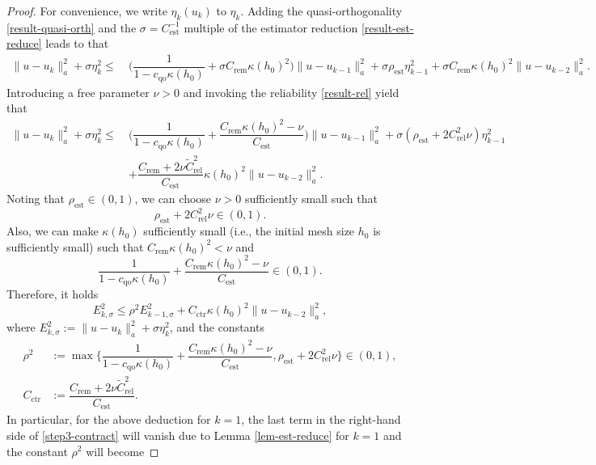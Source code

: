 \documentclass[preprint,times]{elsarticle}%
\numberwithin{algorithm}{section}
\numberwithin{equation}{section}
\newcommand{\rel}{\mathrm{rel}}
\newcommand{\est}{\mathrm{est}}
\newcommand{\rem}{\mathrm{rem}}
\newcommand{\ctr}{\mathrm{ctr}}
\newcommand{\qoo}{\mathrm{qo}}
\newcommand{\anorm}[1]{\|#1\|_a}
\def\leq{\leqslant}
\begin{document}
\begin{proof}For convenience, we write $\eta_k(u_k)$ to $\eta_k$. Adding the quasi-orthogonality \eqref{result-quasi-orth} and the $\sigma = C_\est^{-1}$  multiple of the estimator reduction \eqref{result-est-reduce} leads to that 
	\begin{align}
		\anorm{u-u_k}^2 + \sigma\eta_k^2
		\leq~& \Big(\dfrac{1}{1-c_\qoo \kappa(h_0)} + \sigma C_\rem\kappa(h_0)^2\Big)\anorm{u-u_{k-1}}^2 + \sigma \rho_\est\eta_{k-1}^2+ \sigma C_\rem\kappa(h_0)^2\anorm{u-u_{k-2}}^2. \label{step1-contract}
	\end{align}
Introducing a free parameter $\nu > 0$ and invoking the reliability \eqref{result-rel} yield that 
	\begin{align}
		\anorm{u-u_k}^2 + \sigma\eta_k^2
		\leq~& \Big(\dfrac{1}{1-c_\qoo \kappa(h_0)} + \dfrac{C_\rem \kappa(h_0)^2 - \nu}{C_\est}\Big)\anorm{u-u_{k-1}}^2 + \sigma (\rho_\est + 2C_\rel^2 \nu) \eta_{k-1}^2 \nonumber\\
		&+ \dfrac{C_\rem+2\nu \widetilde{C}_\rel^2}{C_\est}\kappa(h_0)^2\anorm{u-u_{k-2}}^2. \label{step2-contract}
	\end{align}
Noting that $\rho_\est \in (0,1)$, we can choose $\nu > 0$ sufficiently small such that 
	\begin{equation*}
		\rho_\est + 2C_\rel^2 \nu \in (0,1). 
	\end{equation*}
 Also, we can make $\kappa(h_0)$ sufficiently small (i.e., the initial mesh size $h_0$ is sufficiently small) such that $C_\rem \kappa(h_0)^2 < \nu$ and 
	\begin{equation*}
		\dfrac{1}{1-c_\qoo \kappa(h_0)} + \dfrac{C_\rem \kappa(h_0)^2 - \nu}{C_\est} \in (0,1). 
	\end{equation*}
Therefore, it holds 
	\begin{equation}\label{step3-contract}
	E_{k,\sigma}^2 \leq \rho^2 E_{k-1,\sigma}^2 + C_\ctr \kappa(h_0)^2 \anorm{u-u_{k-2}}^2,
	\end{equation}
where $E_{k,\sigma}^2:=\anorm{u-u_k}^2 + \sigma \eta_k^2$, and the constants 
	\begin{align}
		\rho^2 &:= \max\{\dfrac{1}{1-c_\qoo \kappa(h_0)} + \dfrac{C_\rem \kappa(h_0)^2 - \nu}{C_\est},\rho_\est + 2C_\rel^2 \nu\} \in (0,1), \nonumber\\
		C_\ctr &:= \dfrac{C_\rem+2\nu \widetilde{C}_\rel^2}{C_\est}. \nonumber
	\end{align}
In particular, for the above deduction for $k = 1$, the last term in the right-hand side of \eqref{step3-contract} will vanish due to Lemma \ref{lem-est-reduce} for $k=1$ and the constant $\rho^2$ will become 

\end{proof}
\end{document}
